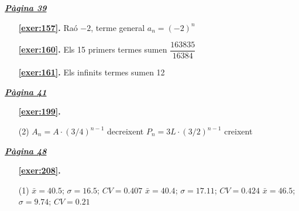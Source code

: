 
\hyperlink{page.39}{\textbf{\em Pàgina 39}}
\begin{enumerate}
\item[\fontfamily{phv}\selectfont\color{blue}\textbf{\ref{exer:157}. }] \label{ans:157} 
Raó $-2$, terme general $a_n=(-2)^n$
 \end{enumerate}
\begin{enumerate}
\item[\fontfamily{phv}\selectfont\color{blue}\textbf{\ref{exer:160}. }] \label{ans:160} 
Els 15 primers termes sumen $\dfrac {163835}{16384}$
\item[\fontfamily{phv}\selectfont\color{blue}\textbf{\ref{exer:161}. }] \label{ans:161} 
Els infinits termes sumen 12
 \end{enumerate}
\vspace{0.3cm}


\hyperlink{page.41}{\textbf{\em Pàgina 41}}
\begin{enumerate}



 \item[\fontfamily{phv}\selectfont\color{blue}\textbf{\ref{exer:199}. }] \label{ans:199}
 \begin{tasks}[column-sep=1em, item-indent=1.3333em](2)
	 \task* $A_n = A \cdot (3/4)^{n-1}$ decreixent
	 \task* $P_n = 3L \cdot (3/2)^{n-1}$ creixent
\end{tasks}
 \end{enumerate}

 \vspace{1cm} 
 

\vspace{0.3cm}


\hyperlink{page.48}{\textbf{\em Pàgina 48}}
\begin{enumerate}



 \item[\fontfamily{phv}\selectfont\color{blue}\textbf{\ref{exer:208}. }] \label{ans:208}
 \begin{tasks}[column-sep=1em, item-indent=1.3333em](1)
	 \task* $\bar x=40.5$; $\sigma =16.5$; $CV=0.407$
	 \task* $\bar x=40.4$; $\sigma =17.11$; $CV=0.424$
	 \task* $\bar x=46.5$; $\sigma =9.74$; $CV=0.21$ \par {}
\end{tasks}
 \end{enumerate}
\vspace{0.3cm}

